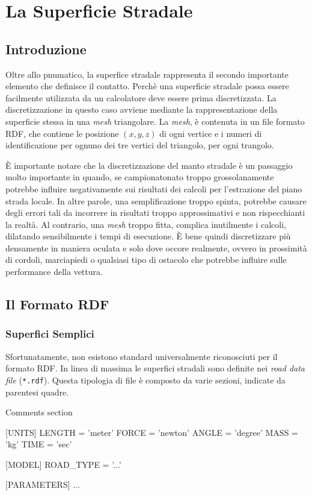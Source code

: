 \chapter{La Superficie Stradale}
\label{rdf}
%
\section{Introduzione}
Oltre allo pnumatico, la superfice stradale rappresenta il secondo importante elemento che definisce il contatto. Perchè una superficie stradale possa essere facilmente utilizzata da un calcolatore deve essere prima discretizzata. La discretizzazione in questo caso avviene mediante la rappresentazione della superficie stessa in una \textit{mesh} triangolare. La \textit{mesh}, è contenuta in un file formato \ac{RDF}, che contiene le posizione $(x,y,z)$ di ogni vertice e i numeri di identificazione per ognuno dei tre vertici del triangolo, per ogni trangolo.

È importante notare che la discretizzazione del manto stradale è un passaggio molto importante in quando, se campionatonato troppo grossolanamente potrebbe influire negativamente sui risultati dei calcoli per l'estrazione del piano strada locale. In altre parole, una semplificazione troppo spinta, potrebbe causare degli errori tali da incorrere in risultati troppo approssimativi e non rispecchianti la realtà. Al contrario, una \textit{mesh} troppo fitta, complica inutilmente i calcoli, dilatando sensibilmente i tempi di esecuzione. È bene quindi discretizzare più densamente in maniera oculata e solo dove occore realmente, ovvero in prossimità di cordoli, marciapiedi o qualsiasi tipo di ostacolo che potrebbe influire sulle performance della vettura. 
%
\section{Il Formato RDF}
%
\subsection{Superfici Semplici}
Sfortunatamente, non esistono standard universalmente riconosciuti per il formato RDF. In linea di massima le superfici stradali sono definite nei \textit{road data file} (\texttt{*.rdf}). Questa tipologia di file è composto da varie sezioni, indicate da parentesi quadre.

\begin{pseudoc}
	{ Comments section }
	
	[UNITS]
	LENGTH = 'meter'
	FORCE = 'newton'
	ANGLE = 'degree'
	MASS = 'kg'
	TIME = 'sec'
	
	[MODEL]
	ROAD\_TYPE = '...'
	
	[PARAMETERS]
	...
\end{pseudoc}


